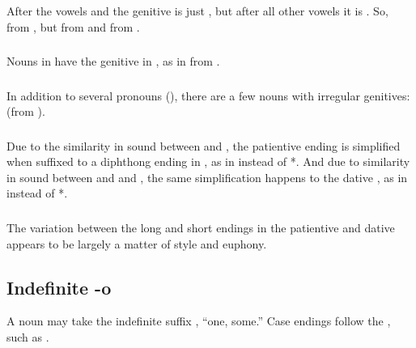 \subsubsection{} After the vowels  and  the genitive is just
, but after all other vowels it is .  So, 
from , but  from  and 
from .

\subsubsection{} Nouns in  have the genitive in , as in
 from .

\subsubsection{} In addition to several pronouns
(), there are a few nouns with
irregular genitives:  (from ).

\subsubsection{} Due to the similarity in sound between  and
, the patientive ending  is simplified when suffixed to a
diphthong ending in , as in   instead of
*.  And due to similarity in sound between  and and
, the same simplification happens to the dative , as in
  instead of *.

\subsubsection{} The variation between the long and short endings in
the patientive and dative appears to be largely a matter of style and
euphony.

\subsection{Indefinite -o} A noun may take the indefinite suffix
, ``one, some.''  Case endings follow the , such
as .

